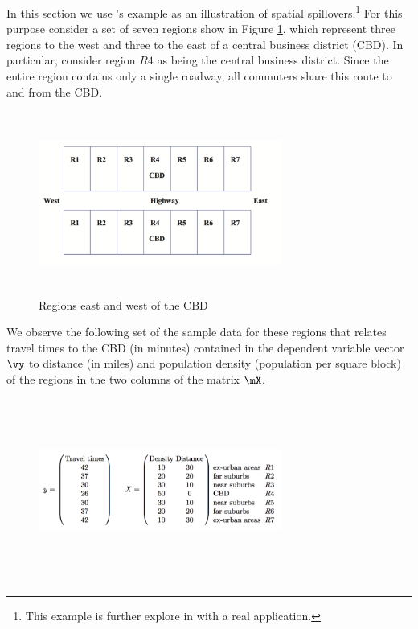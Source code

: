 \documentclass[english,12pt]{book}\usepackage[]{graphicx}\usepackage[]{xcolor}
\begin{document}
In this section we use \cite{lesage2010introduction}'s example as an illustration of spatial spillovers.\footnote{This example is further explore in \cite{kirby2009changes} with a real application.} For this purpose consider a set of seven regions show in Figure \ref{fig:lesage-example}, which represent three regions to the west and three to the east of a central business district (CBD). In particular, consider region $R4$ as being the central business district. Since the entire region contains only a single roadway, all commuters share this route to and from the CBD.


\begin{figure}[ht]
\caption{Regions east and west of the CBD}\label{fig:lesage-example}
		    \centering 
		      \includegraphics[width = 8cm, height=6cm]{figure/lesage.png}
\end{figure}

We observe the following set of the sample data for these regions that relates travel times to the CBD (in minutes) contained in the dependent variable vector $\vy$ to distance (in miles) and population density (population per square block) of the regions in the two columns of the matrix $\mX$.

\begin{figure}[H]
		    \centering 
		      \includegraphics[width = 8cm, height=6cm]{figure/lesage2.png}
\end{figure}	
\end{document}
